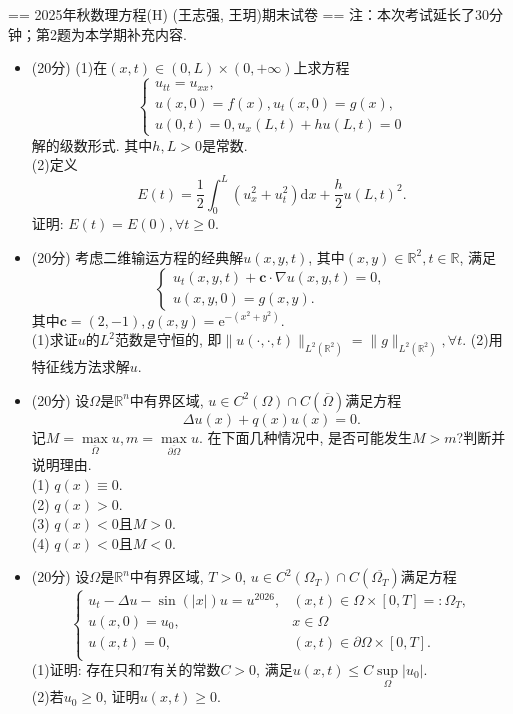 == 2025年秋数理方程(H) (王志强, 王玥)期末试卷 ==
\qquad 注：本次考试延长了30分钟；第2题为本学期补充内容.
\begin{itemize}
    \item[1.](20分)
    (1)在$(x,t)\in (0,L)\times (0,+\infty)$上求方程
        $$\begin{cases}
        u_{tt}=u_{xx},\\
        u(x,0)=f(x),u_t(x,0)=g(x),\\
        u(0,t)=0,u_x(L,t)+hu(L,t)=0
    \end{cases}$$
    解的级数形式. 其中$h,L>0$是常数.\\
    (2)定义
    $$E(t)=\frac{1}{2}\int_0^L (u_x^2+u_t^2)\mathrm{d} x+\frac{h}{2}u(L,t)^2.$$
    证明: $E(t)=E(0),\forall t\ge0$.

    \item[2.](20分)
    考虑二维输运方程的经典解$u(x,y,t)$, 其中$(x,y)\in \mathbb{R}^2,t\in\mathbb{R}$, 满足
        $$\begin{cases}
            u_t(x,y,t)+ \mathbf{c}\cdot \nabla u(x,y,t)=0,\\
            u(x,y,0)=g(x,y).
        \end{cases}$$
    其中$\mathbf{c}=(2,-1),g(x,y)=\mathrm{e}^{-(x^2+y^2)}$.\\
    (1)求证$u$的$L^2$范数是守恒的, 即$\|u(\cdot,\cdot,t)\|_{L^2(\mathbb{R}^2)}=\|g\|_{L^2(\mathbb{R}^2)},\forall t$.
    (2)用特征线方法求解$u$.

    \item[3.](20分)
    设$\Omega$是$\mathbb{R}^n$中有界区域, $u\in C^2(\Omega)\cap C(\overline{\Omega})$满足方程
    $$\Delta u(x)+q(x)u(x)=0.$$
    记$M=\max\limits_{\overline{\Omega}}u,m=\max\limits_{\overline{\partial\Omega}}u$. 在下面几种情况中, 是否可能发生$M>m$?判断并说明理由.\\
    (1) $q(x)\equiv 0$.\\
    (2) $q(x)>0$.\\
    (3) $q(x)<0$且$M>0$.\\
    (4) $q(x)<0$且$M<0$.

    \item[4.](20分)
    设$\Omega$是$\mathbb{R}^n$中有界区域, $T>0$, $u\in C^2(\Omega_T)\cap C(\overline{\Omega_T})$满足方程
    $$\begin{cases}
        u_t-\Delta u-\sin(|x|)u=u^{2026}, &(x,t)\in \Omega\times [0,T]=:\Omega_T, \\
        u(x,0)=u_0 ,& x\in\Omega\\
        u(x,t)=0 ,&(x,t)\in \partial\Omega\times [0,T].\\
    \end{cases}$$
    (1)证明: 存在只和$T$有关的常数$C>0$, 满足$u(x,t)\le C\sup\limits_{\Omega}|u_0|$.\\
    (2)若$u_0\ge 0$, 证明$u(x,t)\ge 0$.


\end{itemize}

